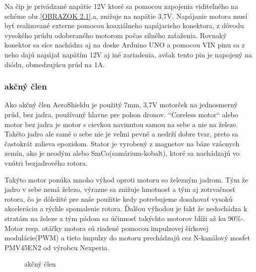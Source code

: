 Na čip je privádzané napätie 12V ktoré sa pomocou zapojenia viditeľného na schéme obr.\ref{OBRAZOK 2.1}.a, znižuje na napätie 3,7V. Napájanie motora musí byť realizované externe pomocou koaxiálneho napájacieho konektora, z dôvodu vysokého prúdu odoberaného motorom počas silného zaťaženia. Rovnaký konektor sa síce nachádza aj na doske Arduino UNO a pomocou VIN pinu sa z neho dajú napájať napätím 12V aj iné zariadenia, avšak tento pin je napojený na diódu, obmedzujúcu prúd na 1A\cite{ampere}\cite{ampere2}.

\subsubsection{akčný člen}
\label{akcclen}

Ako akčný člen AeroShieldu je použitý 7mm, 3,7V motorček na jednosmerný prúd, bez jadra, používaný hlavne pre pohon dronov. “Coreless motor“ alebo motor bez jadra je motor s cievkou navinutou samou na sebe a nie na železe\cite{coreless}. Takéto jadro ale samé o sebe nie je veľmi pevné a nedrží dobre tvar, preto sa častokrát zalieva epoxidom. Stator je vyrobený z magnetov na báze vzácnych zemín, ako je neodým alebo SmCo(samárium-kobalt), ktoré sa nachádzajú vo vnútri bezjadrového rotora.

Takýto motor ponúka mnoho výhod oproti motoru so železným jadrom. Tým že jadro v sebe nemá železo, výrazne sa znižuje hmotnosť a tým aj zotrvačnosť rotora, čo je dôležité pre naše použitie kedy potrebujeme dosahovať vysokú akceleráciu a rýchle spomalenie rotora. Ďalšou výhodou je fakt že nedochádza k stratám na železe a tým pádom sa účinnosť takýchto motorov blíži až ku 90\%-\cite{5545147}. Motor resp. otáčky motora sú riadené pomocou impulzovej šírkovej modulácie(PWM) a tieto impulzy do motoru prechádzajú cez N-kanálový mosfet PMV45EN2 od výrobcu Nexperia\cite{pmv}.



\begin{figure}[!tbh]
	\hfill
	\hfill
	\hfill
	\caption{akčný člen}\label{OBRAZOK 2.3}
\end{figure}


